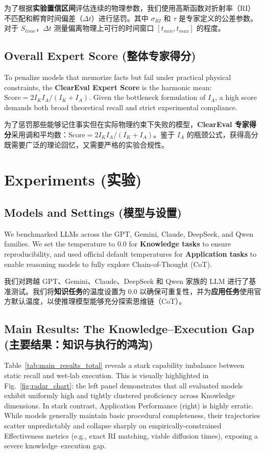 \documentclass[runningheads]{llncs}
\begin{document}
为了根据\textbf{实验置信区间}评估连续的物理参数，我们使用高斯函数对折射率（RI）不匹配和孵育时间偏差（$\Delta t$）进行惩罚。其中 $\sigma_{RI}$ 和 $\tau$ 是专家定义的公差参数。对于 $S_{time}$，$\Delta t$ 测量偏离物理上可行的时间窗口 $[t_{min}, t_{max}]$ 的程度。

\subsection{Overall Expert Score (整体专家得分)}

To penalize models that memorize facts but fail under practical physical constraints, the \textbf{ClearEval Expert Score} is the harmonic mean: $\text{Score} = 2 I_K I_A / (I_K + I_A)$. Given the bottleneck formulation of $I_A$, a high score demands both broad theoretical recall and strict experimental compliance.

为了惩罚那些能够记住事实但在实际物理约束下失败的模型，\textbf{ClearEval 专家得分}采用调和平均数：$\text{Score} = 2 I_K I_A / (I_K + I_A)$。鉴于 $I_A$ 的瓶颈公式，获得高分既需要广泛的理论回忆，又需要严格的实验合规性。

\section{Experiments (实验)}
\subsection{Models and Settings (模型与设置)}

We benchmarked LLMs across the GPT, Gemini, Claude, DeepSeek, and Qwen families. We set the temperature to $0.0$ for \textbf{Knowledge tasks} to ensure reproducibility, and used official default temperatures for \textbf{Application tasks} to enable reasoning models to fully explore Chain-of-Thought (CoT).

我们对跨越 GPT、Gemini、Claude、DeepSeek 和 Qwen 家族的 LLM 进行了基准测试。我们将\textbf{知识任务}的温度设置为 $0.0$ 以确保可重复性，并为\textbf{应用任务}使用官方默认温度，以使推理模型能够充分探索思维链（CoT）。

\subsection{Main Results: The Knowledge--Execution Gap (主要结果：知识与执行的鸿沟)}

Table~\ref{tab:main_results_total} reveals a stark capability imbalance between static recall and wet-lab execution. This is visually highlighted in Fig.~\ref{fig:radar_chart}: the left panel demonstrates that all evaluated models exhibit uniformly high and tightly clustered proficiency across Knowledge dimensions. In stark contrast, Application Performance (right) is highly erratic. While models generally maintain basic procedural completeness, their trajectories scatter unpredictably and collapse sharply on empirically-constrained Effectiveness metrics (e.g., exact RI matching, viable diffusion times), exposing a severe knowledge--execution gap.
\end{document}
